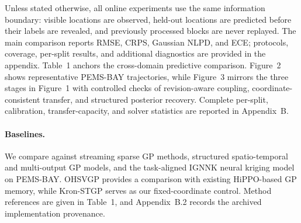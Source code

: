 \documentclass[twoside]{article}
\begin{document}
Unless stated otherwise, all online experiments use the same information boundary:
visible locations are observed, held-out locations are predicted before their labels
are revealed, and previously processed blocks are never replayed. The main
comparison reports RMSE, CRPS, Gaussian NLPD, and ECE; protocols, coverage,
per-split results, and additional diagnostics are provided in the appendix.
Table~1 anchors the cross-domain predictive comparison. Figure~2 shows representative PEMS-BAY trajectories, while Figure~3 mirrors the three stages in Figure~1 with controlled checks of revision-aware coupling, coordinate-consistent transfer, and structured posterior recovery. Complete per-split, calibration, transfer-capacity, and solver statistics are reported in Appendix~B.

\paragraph{Baselines.}
We compare against streaming sparse GP methods, structured spatio-temporal and
multi-output GP models, and the task-aligned IGNNK neural kriging model on
PEMS-BAY. OHSVGP provides a comparison with existing HiPPO-based GP memory,
while Kron-STGP serves as our fixed-coordinate control. Method references are
given in Table~1, and Appendix~B.2 records the archived implementation provenance.
\end{document}

